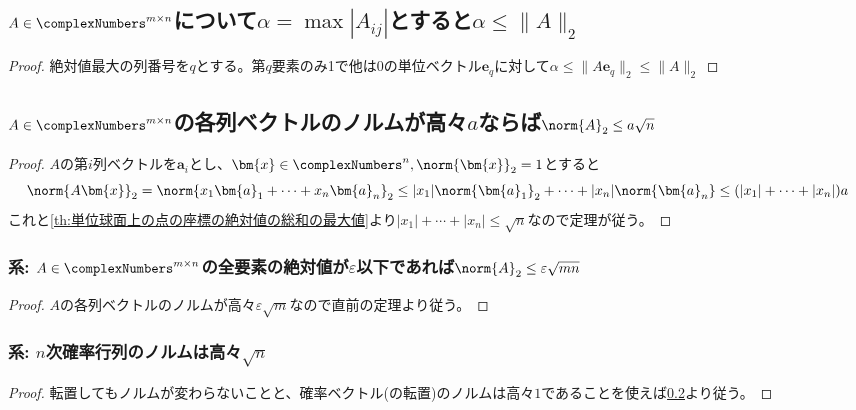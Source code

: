         \subsection{\texorpdfstring{$A \in \complexNumbers^{m\times n}$}{A∈C\string^(m×n)}について\texorpdfstring{$\alpha = \max|A_{ij}|$}{α = max|A\_(i,j)|}とすると\texorpdfstring{$\alpha \leq \|A\|_2$}{α ≦ ||A||\_2}}
            \begin{proof}
                \quad\par
                絶対値最大の列番号を$q$とする。第$q$要素のみ1で他は0の単位ベクトル$\bm{e}_q$に対して$\alpha \leq \|A\bm{e}_q\|_2 \leq \|A\|_2$
            \end{proof}
        \subsection{\texorpdfstring{$A\in\complexNumbers^{m\times n}$}{A∈C\string^(m×n)}の各列ベクトルのノルムが高々\texorpdfstring{$a$}{a}ならば\texorpdfstring{$\norm{A}_2\leq a\sqrt{n}$}{||A||\_2 ≦ a√n}}
            \label{th:mxn実行列Aの各列ベクトルのノルムが高々aならなAのノルムは高々a.sqrt(n)}
            \begin{proof}
                \quad\par
                $A$の第$i$列ベクトルを$\bm{a}_i$とし、$\bm{x}\in\complexNumbers^n,\norm{\bm{x}}_2=1$とすると
                \[\norm{A\bm{x}}_2=\norm{x_1\bm{a}_1+\dotsb+x_n\bm{a}_n}_2 \leq |x_1|\norm{\bm{a}_1}_2 + \dotsb + |x_n|\norm{\bm{a}_n} \leq (|x_1|+\dotsb+|x_n|)a\]
                これと\ref{th:単位球面上の点の座標の絶対値の総和の最大値}より$|x_1|+\dotsb+|x_n|\leq\sqrt{n}$なので定理が従う。
            \end{proof}
            \subsubsection{系: \texorpdfstring{$A\in\complexNumbers^{m\times n}$}{A∈C\string^(m×n)}の全要素の絶対値が\texorpdfstring{$\varepsilon$}{ε}以下であれば\texorpdfstring{$\norm{A}_2\leq \varepsilon\sqrt{mn}$}{||A||\_2 ≦ ε√(mn)}}
                \begin{proof}
                    $A$の各列ベクトルのノルムが高々$\varepsilon\sqrt{m}$なので直前の定理より従う。
                \end{proof}
            \subsubsection{系: \texorpdfstring{$n$}{n}次確率行列のノルムは高々\texorpdfstring{$\sqrt{n}$}{√n}}
                \begin{proof}
                    \quad\par
                    転置してもノルムが変わらないことと、確率ベクトル(の転置)のノルムは高々$1$であることを使えば\ref{th:mxn実行列Aの各列ベクトルのノルムが高々aならなAのノルムは高々a.sqrt(n)}より従う。
                \end{proof}
